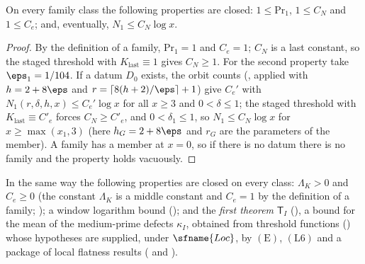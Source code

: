 \begin{lemma}\label{pf:linkG:otherclosed}
On every family class the following properties are closed: $1\le\mathrm{Pr}_1$, $1\le C_N$ and $1\le C_e$; and,
eventually, $N_1\le C_N\log x$.
\end{lemma}

\begin{proof}
By the definition of a family, $\mathrm{Pr}_1=1$ and $C_e=1$; $C_N$ is a last constant, so the staged threshold with
$K_{\mathrm{last}}\equiv1$ gives $C_N\ge1$. For the second property take $\eps_1=1/104$. If a datum $D_0$ exists, the orbit
counts (, applied with $h=2+8\eps$ and
$r=\lceil8(h+2)/\eps\rceil+1$) give $C_e'$ with $N_1(r,\delta,h,x)\le C_e'\log x$ for all $x\ge3$ and $0<\delta\le1$; the
staged threshold with $K_{\mathrm{last}}\equiv C'_e$ forces $C_N\ge C'_e$, and $0<\delta_1\le1$, so $N_1\le C_N\log x$ for
$x\ge\max(x_1,3)$ (here $h_G=2+8\eps$ and $r_G$ are the parameters of the member). A family has a member at $x=0$, so if
there is no datum there is no family and the property holds vacuously.
\end{proof}

In the same way the following properties are closed on every class: $\Lambda_K>0$ and $C_e\ge0$ (the constant
$\Lambda_K$ is a middle constant and $C_e=1$ by the definition of a family;
); a window logarithm bound
(); and the \emph{first theorem}
$\mathsf T_{I}$ (), a bound for the mean of the
medium-prime defects $\kappa_I$, obtained from threshold functions
() whose hypotheses are supplied, under
$\sfname{Loc}$, by $(\mathrm E)$, $(\mathrm L6)$ and a package of local flatness results
( and ).

